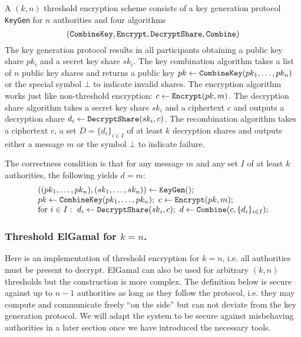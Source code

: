 \documentclass[envcountsame]{llncs}
\newcommand{\alg}[1]{\textup{\texttt{#1}}}
\begin{document}
\begin{definition}
A $(k, n)$ threshold encryption scheme consists of a key generation protocol
\alg{KeyGen} for $n$ authorities and four algorithms
\[
\left(\alg{CombineKey}, \alg{Encrypt}, \alg{DecryptShare}, \alg{Combine}\right)
\]
The key generation protocol results in all participants obtaining a public key
share $pk_i$ and a secret key share $sk_i$. The key combination algorithm takes
a list of $n$ public key shares and returns a public key $pk \gets
\alg{CombineKey}(pk_1, \ldots, pk_n)$ or the special symbol $\bot$ to indicate
invalid shares. The encryption algorithm works just like non-threshold
encryption: $c \gets \alg{Encrypt}(pk, m)$. The decryption share algorithm takes
a secret key share $sk_i$ and a ciphertext $c$ and outputs a decryption share
$d_i \gets \alg{DecryptShare}(sk_i, c)$. The recombination algorithm takes a
ciphertext $c$, a set $D = \{d_i\}_{i \in I}$ of at least $k$ decryption shares
and outputs either a message $m$ or the symbol $\bot$ to indicate failure.

The correctness condition is that for any message $m$ and any set $I$ of at
least $k$ authorities, the following yields $d = m$:
\[ \begin{array}{l}
((pk_1, \ldots, pk_n), (sk_1, \ldots, sk_n)) \gets \alg{KeyGen}(); \\
pk \gets \alg{CombineKey}(pk_1, \ldots, pk_n);\ 
c \gets \alg{Encrypt}(pk, m); \\
\textrm{for } i \in I:\ d_i \gets \alg{DecryptShare}(sk_i, c);\ 
d \gets \alg{Combine}(c, \{d_i\}_{i \in I});
\end{array} \]
\end{definition}

\subsubsection{Threshold ElGamal for $k = n$.}
Here is an implementation of threshold encryption for $k = n$, i.e. all
authorities must be present to decrypt. ElGamal can also be used for arbitrary
$(k, n)$ thresholds but the construction is more complex.
The definition below is secure against up to $n - 1$ authorities as long as they
follow the protocol, i.e. they may compute and communicate freely ``on the
side'' but can not deviate from the key generation protocol. We will adapt the
system to be secure against misbehaving authorities in a later section once we
have introduced the necessary tools.
\end{document}
